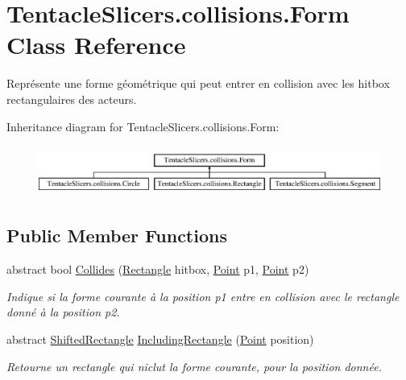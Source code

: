 \hypertarget{class_tentacle_slicers_1_1collisions_1_1_form}{}\section{Tentacle\+Slicers.\+collisions.\+Form Class Reference}
\label{class_tentacle_slicers_1_1collisions_1_1_form}


Représente une forme géométrique qui peut entrer en collision avec les hitbox rectangulaires des acteurs.  


Inheritance diagram for Tentacle\+Slicers.\+collisions.\+Form\+:\begin{figure}[H]
\begin{center}
\leavevmode
\includegraphics[height=1.674140cm]{class_tentacle_slicers_1_1collisions_1_1_form}
\end{center}
\end{figure}
\subsection*{Public Member Functions}
\begin{DoxyCompactItemize}
\item 
abstract bool \hyperlink{class_tentacle_slicers_1_1collisions_1_1_form_a51bde480596aa821d6d927427864ae5c}{Collides} (\hyperlink{class_tentacle_slicers_1_1collisions_1_1_rectangle}{Rectangle} hitbox, \hyperlink{class_tentacle_slicers_1_1general_1_1_point}{Point} p1, \hyperlink{class_tentacle_slicers_1_1general_1_1_point}{Point} p2)
\begin{DoxyCompactList}\small\item\em Indique si la forme courante à la position p1 entre en collision avec le rectangle donné à la position p2. \end{DoxyCompactList}\item 
abstract \hyperlink{struct_tentacle_slicers_1_1collisions_1_1_shifted_rectangle}{Shifted\+Rectangle} \hyperlink{class_tentacle_slicers_1_1collisions_1_1_form_a00c94b5a1e83d9db6aa3a4cab969fd2c}{Including\+Rectangle} (\hyperlink{class_tentacle_slicers_1_1general_1_1_point}{Point} position)
\begin{DoxyCompactList}\small\item\em Retourne un rectangle qui niclut la forme courante, pour la position donnée. \end{DoxyCompactList}\end{DoxyCompactItemize}


